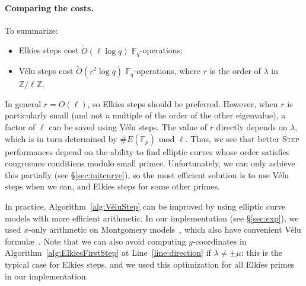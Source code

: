 \documentclass{llncs}
\newcommand{\F}{\mathbb{F}}
\newcommand{\Z}{\mathbb{Z}}
\newcommand{\softO}{\tilde{O}}
\newcommand{\algstyle}[1]{\textsc{#1}}
\begin{document}
\paragraph{Comparing the costs.}
To summarize:
\begin{itemize}
\item Elkies steps cost $\softO(\ell\log q)$ $\F_q$-operations;
\item Vélu steps cost $\softO(r^2\log q)$ $\F_q$-operations,
    where $r$ is the order of $\lambda$ in $\Z/\ell\Z$.
\end{itemize}
In general $r = O(\ell)$, so Elkies steps should be preferred. 
However, when $r$ is particularly small
(and not a multiple of the order of the other eigenvalue),
a factor of $\ell$ can be saved using Vélu steps.
The value of $r$ directly depends on $\lambda$, which is in turn determined by
$\#E(\F_p)$ mod $\ell$. Thus, we see that better \algstyle{Step} performances
depend on the ability to find elliptic curves whose order
satisfies congruence conditions modulo small primes.
Unfortunately, we can only achieve this partially
(see \S\ref{sec:initcurve}), so the most efficient solution is
to use Vélu steps when we can, and Elkies steps for some other primes.

In practice, Algorithm~\ref{alg:VéluStep} can be improved
by using elliptic curve models with more efficient arithmetic.
In our implementation (see \S\ref{sec:exp}),
we used $x$-only arithmetic on Montgomery models~\cite{Montgomery87,CostelloSmith2017},
which also have convenient Vélu formul\ae~\cite{CostelloH17,Renes2018}.
Note that we can also avoid computing $y$-coordinates in
Algorithm~\ref{alg:ElkiesFirstStep}
at Line~\ref{line:direction} if $\lambda\neq\pm\mu$:
this is the typical case for Elkies steps, and we used this
optimization for all Elkies primes in our implementation.
\end{document}
